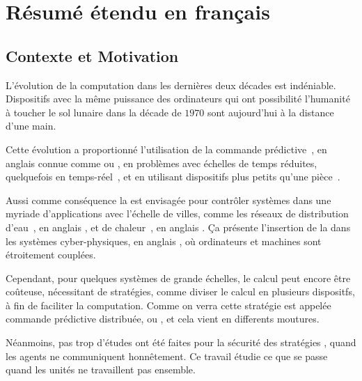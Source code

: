 \documentclass[../main.tex]{subfiles}
\begin{document}
\chapter{Résumé étendu en français}

\section{Contexte et Motivation}\label{sec:cont-et-motiv}

L'évolution de la computation dans les dernières deux décades est indéniable.
Dispositifs avec la même puissance des ordinateurs qui ont possibilité l'humanité à toucher le sol lunaire dans la décade de $1970$ sont aujourd'hui à la distance d'une main.

Cette évolution a proportionné l'utilisation de la commande prédictive~\cite{GarciaEtAl1989}, en anglais
connue comme \mpclong{} ou \mpcshort, en problèmes avec échelles de temps réduites, quelquefois en temps-réel~\cite{BesselmannEtAl2008}, et en utilisant dispositifs plus petits qu'une pièce~\cite{BanguraMahony2014}.

Aussi comme conséquence la \mpc{} est envisagée pour contrôler systèmes dans une myriade d'applications avec l'échelle de villes, comme les réseaux de distribution d'eau~\cite{ZhangEtAl2021}, en anglais
\wdns, et de chaleur~\cite{TaylorEtAl2021}, en anglais \dhns.
Ça présente l'insertion de la \mpc{} dans les systèmes cyber-physiques, en anglais \cps{}, où ordinateurs et machines sont étroitement couplées.

Cependant, pour quelques systèmes de grande échelles, le calcul peut encore être coûteuse, nécessitant de stratégies, comme diviser le calcul en plusieurs dispositfs, à fin de faciliter la computation.
Comme on verra cette stratégie est appelée commande prédictive distribuée, ou \dmpc{}, et cela vient en differents moutures.

Néanmoins, pas trop d'études ont été faites pour la sécurité des stratégies \dmpc{}, quand les agents ne communiquent honnêtement.
Ce travail étudie ce que se passe quand les unités ne travaillent pas ensemble.
\end{document}
